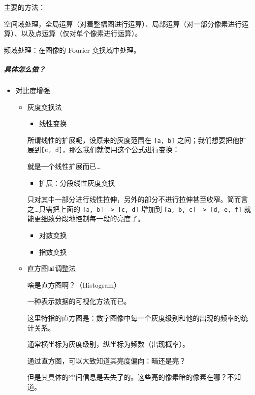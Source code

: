 \documentclass[
]{article}
\begin{document}
主要的方法：

空间域处理，全局运算（对着整幅图进行运算）、局部运算（对一部分像素进行运算）、以及点运算（仅对单个像素进行运算）。

频域处理：在图像的 Fourier 变换域中处理。

\hypertarget{header-n119}{%
\subparagraph{具体怎么做？}\label{header-n119}}

\begin{itemize}
\item
  对比度增强

  \begin{itemize}
  \item
    灰度变换法

    \begin{itemize}
    \item
      线性变换
    \end{itemize}

    所谓线性的扩展呢，设原来的灰度范围在 \texttt{{[}a,\ b{]}}
    之间；我们想要把他扩展到\texttt{{[}c,\ d{]}}，那么我们就使用这个公式进行变换：

    就是一个线性扩展而已\ldots{}

    \begin{itemize}
    \item
      扩展：分段线性灰度变换
    \end{itemize}

    只对其中一部分进行线性拉伸，另外的部分不进行拉伸甚至收窄。简而言之\ldots 只需把上面的
    \texttt{{[}a,\ b{]}\ -\textgreater{}\ {[}c,\ d{]}} 增加到
    \texttt{{[}a,\ b,\ c{]}\ -\textgreater{}\ {[}d,\ e,\ f{]}}
    就能更细致分段地控制每一段的亮度了。

    \begin{itemize}
    \item
      对数变换
    \item
      指数变换
    \end{itemize}
  \item
    直方图📊调整法

    啥是直方图啊？（Histogram）

    一种表示数据的可视化方法而已。

    这里特指的直方图是：数字图像中每一个灰度级别和他的出现的频率的统计关系。

    通常横坐标为灰度级别，纵坐标为频数（出现概率）。

    通过直方图，可以大致知道其亮度偏向：暗还是亮？

    但是其具体的空间信息是丢失了的。这些亮的像素暗的像素在哪？不知道。


\end{itemize}
\end{itemize}
\end{document}
